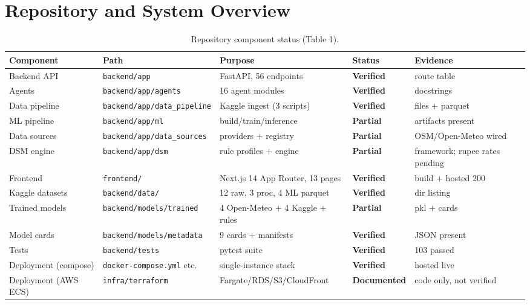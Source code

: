 \documentclass[11pt,a4paper]{article}
\newcommand{\stV}{\textcolor{cok}{\textbf{Verified}}}
\newcommand{\stP}{\textcolor{cpart}{\textbf{Partial}}}
\newcommand{\stDoc}{\textcolor{cpart}{\textbf{Documented}}}
\newcommand{\code}[1]{\texttt{\small #1}}
\begin{document}
\section{Repository and System Overview}
\begin{table}[H]\centering\footnotesize
\caption{Repository component status (Table 1).}\label{tab:components}
\begin{tabular}{@{}p{2.7cm}p{3.2cm}p{4.0cm}l l@{}}
\toprule
\textbf{Component} & \textbf{Path} & \textbf{Purpose} & \textbf{Status} & \textbf{Evidence}\\
\midrule
Backend API & \code{backend/app} & FastAPI, 56 endpoints & \stV & route table\\
Agents & \code{backend/app/agents} & 16 agent modules & \stV & docstrings\\
Data pipeline & \code{backend/app/data\_pipeline} & Kaggle ingest (3 scripts) & \stV & files + parquet\\
ML pipeline & \code{backend/app/ml} & build/train/inference & \stP & artifacts present\\
Data sources & \code{backend/app/data\_sources} & providers + registry & \stP & OSM/Open-Meteo wired\\
DSM engine & \code{backend/app/dsm} & rule profiles + engine & \stP & framework; rupee rates pending\\
Frontend & \code{frontend/} & Next.js 14 App Router, 13 pages & \stV & build + hosted 200\\
Kaggle datasets & \code{backend/data/} & 12 raw, 3 proc, 4 ML parquet & \stV & dir listing\\
Trained models & \code{backend/models/trained} & 4 Open-Meteo + 4 Kaggle + rules & \stP & pkl + cards\\
Model cards & \code{backend/models/metadata} & 9 cards + manifests & \stV & JSON present\\
Tests & \code{backend/tests} & pytest suite & \stV & 103 passed\\
Deployment (compose) & \code{docker-compose.yml} etc. & single-instance stack & \stV & hosted live\\
Deployment (AWS ECS) & \code{infra/terraform} & Fargate/RDS/S3/CloudFront & \stDoc & code only, not verified\\
\bottomrule
\end{tabular}
\end{table}

\end{document}
